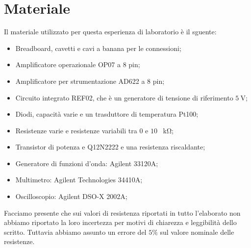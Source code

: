 \section*{Materiale}

Il materiale utilizzato per questa esperienza di laboratorio è il sguente:

\begin{itemize} \itemsep2pt \parskip0pt 
    \item{Breadboard, cavetti e cavi a banana per le connessioni;}
    \item{Amplificatore operazionale OP07 a 8 pin;}
    \item{Amplificatore per strumentazione AD622 a 8 pin;}
    \item{Circuito integrato REF02, che è un generatore di tensione di riferimento $\SI{5}{\volt}$;}
    \item{Diodi, capacità varie e un trasduttore di temperatura Pt100;}
    \item{Resistenze varie e resistenze variabili tra $0$ e $10$ \SI{}{\kilo\ohm};}
    \item{Transistor di potenza e Q12N2222 e una resistenza riscaldante;}
    \item{Generatore di funzioni d'onda: Agilent 33120A;}
    \item{Multimetro: Agilent Technologies 34410A;}
    \item{Oscilloscopio: Agilent DSO-X 2002A;}
\end{itemize}

Facciamo presente che sui valori di resistenza riportati in tutto l'elaborato non abbiamo riportato la loro incertezza per motivi di chiarezza e leggibilità dello scritto. Tuttavia abbiamo assunto un errore del $5\%$ sul valore nominale delle resistenze.



